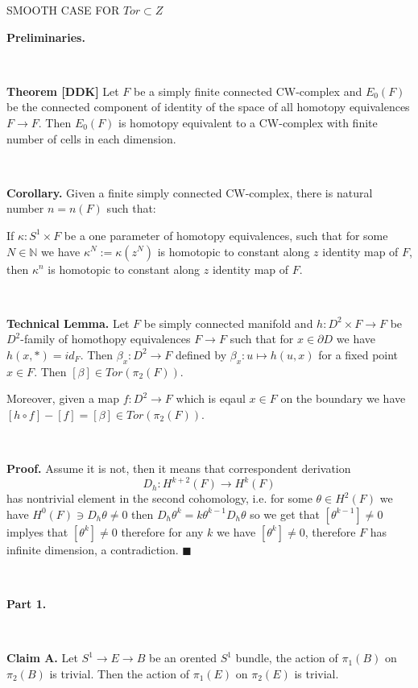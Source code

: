\documentclass{article}
\def\i{\subset}%
\def\NN{\mathbb{N}}%
\begin{document}
\begin{center}
SMOOTH CASE FOR $Tor\i Z$
\end{center}


{\bf Preliminaries.}

\ 

{\bf Theorem [DDK]}  Let $F$ be a simply finite connected CW-complex and 
$E_0(F)$ be the connected component of identity of the 
space of all homotopy equivalences $F\to F$. Then $E_0(F)$ is homotopy equivalent to a CW-complex with finite number of cells in each dimension.

\ 

{\bf Corollary.} Given a finite simply connected CW-complex, there is natural number $n=n(F)$ such that:

 If 
$\kappa:S^1\times F$ be a one parameter of homotopy equivalences, 
such that for some $N\in\NN$ we have $\kappa^N:=\kappa(z^N)$ is homotopic to constant along $z$ identity map of $F$, then $\kappa^{n}$ is homotopic to constant along $z$ identity map of $F$.


\ 

{\bf Technical Lemma.} 
Let $F$ be simply connected manifold and $h:D^2\times F\to F$ be 
$D^2$-family of homothopy equivalences $F\to F$ such that for 
$x\in\partial D$ we have $h(x,*)=id_F$. 
Then $\beta_x:D^2\to F$ defined by $\beta_x:u\mapsto h(u,x)$ for a fixed point $x\in F$. 
Then $[\beta]\in Tor(\pi_2(F))$.

Moreover, given a map $f:D^2\to F$ which is eqaul $x\in F$  on the boundary we have 
$[h\circ f]-[f]=[\beta]\in Tor(\pi_2(F))$.


\ 


{\bf Proof.} Assume it is not, then it means that correspondent derivation 
$$D_h:H^{k+2}(F)\to H^{k}(F)$$
 has nontrivial element in the second cohomology, i.e. for some 
$\theta\in H^2(F)$ we have $H^0(F)\ni D_h\theta\not=0$ then
$D_h\theta^k=k\theta^{k-1}D_h\theta$ so we get that $[\theta^{k-1}]\not=0$ 
implyes that $[\theta^{k}]\not=0$ therefore for any $k$ we have  
$[\theta^{k}]\not=0$, therefore $F$ has infinite dimension, a contradiction. $\blacksquare$

\ 

{\bf Part 1.}

\ 

{\bf Claim A.} 
Let $S^1\to E\to B$ be an orented $S^1$ bundle, the action of $\pi_1(B)$ 
on $\pi_2(B)$ is trivial. 
Then  the action of $\pi_1(E)$ on $\pi_2(E)$ is trivial.

\ 
\end{document}
